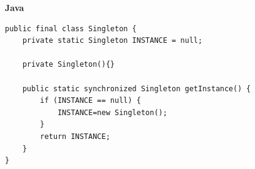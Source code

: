 \textbf{Java}

\begin{verbatim}
public final class Singleton { 
    private static Singleton INSTANCE = null; 
    
    private Singleton(){} 
    
    public static synchronized Singleton getInstance() { 
        if (INSTANCE == null) { 
            INSTANCE=new Singleton(); 
        } 
        return INSTANCE; 
    } 
}
\end{verbatim}

\newpage